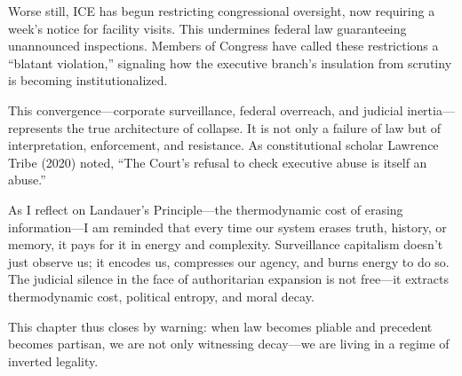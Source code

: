 Worse still, ICE has begun restricting congressional oversight, now
requiring a week's notice for facility visits. This undermines federal
law guaranteeing unannounced inspections. Members of Congress have
called these restrictions a ``blatant violation,'' signaling how the
executive branch's insulation from scrutiny is becoming
institutionalized.

This convergence---corporate surveillance, federal overreach, and
judicial inertia---represents the true architecture of collapse. It is
not only a failure of law but of interpretation, enforcement, and
resistance. As constitutional scholar Lawrence Tribe (2020) noted, ``The
Court's refusal to check executive abuse is itself an abuse.''

As I reflect on Landauer's Principle---the thermodynamic cost of erasing
information---I am reminded that every time our system erases truth,
history, or memory, it pays for it in energy and complexity.
Surveillance capitalism doesn't just observe us; it encodes us,
compresses our agency, and burns energy to do so. The judicial silence
in the face of authoritarian expansion is not free---it extracts
thermodynamic cost, political entropy, and moral decay.

This chapter thus closes by warning: when law becomes pliable and
precedent becomes partisan, we are not only witnessing decay---we are
living in a regime of inverted legality.
